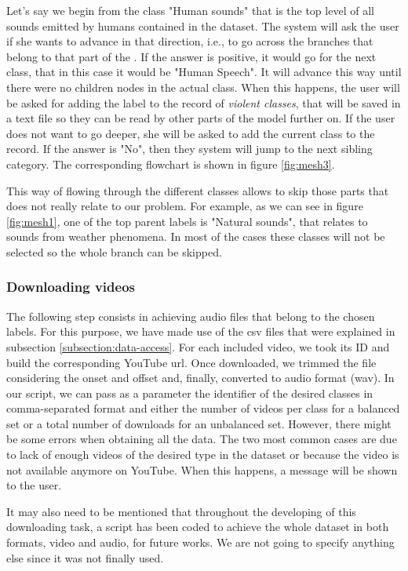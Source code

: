 	
	Let's say we begin from the class "Human sounds" that is the top level of all sounds emitted by humans contained in the dataset. The system will ask the user if she wants to advance in that direction, i.e., to go across the branches that belong to that part of the . If the answer is positive, it would go for the next class, that in this case it would be "Human Speech". It will advance this way until there were no children nodes in the actual class. When this happens, the user will be asked for adding the label to the record of \textit{violent classes}, that will be saved in a text file so they can be read by other parts of the model further on. If the user does not want to go deeper, she will be asked to add the current class to the record. If the answer is "No", then they system will jump to the next sibling category. The corresponding flowchart is shown in figure \ref{fig:mesh3}.
	
	This way of flowing through the different classes allows to skip those parts that does not really relate to our problem. For example, as we can see in figure \ref{fig:mesh1}, one of the top parent labels is "Natural sounds", that relates to sounds from weather phenomena. In most of the cases these classes will not be selected so the whole branch can be skipped. 
	
\subsubsection{Downloading videos}

	The following step consists in achieving audio files that belong to the chosen labels. For this purpose, we have made use of the \acrshort{csv} files that were explained in subsection \ref{subsection:data-access}. For each included video, we took its ID and build the corresponding YouTube \acrshort{url}. Once downloaded, we trimmed the file considering the onset and offset and, finally, converted to audio format (\acrshort{wav}). In our script, we can pass as a parameter the identifier of the desired classes in comma-separated format and either the number of videos per class for a balanced set or a total number of downloads for an unbalanced set. However, there might be some errors when obtaining all the data. The two most common cases are due to lack of enough videos of the desired type in the dataset or because the video is not available anymore on YouTube. When this happens, a message will be shown to the user.
	
	It may also need to be mentioned that throughout the developing of this downloading task, a script has been coded to achieve the whole dataset in both formats, video and audio, for future works. We are not going to specify anything else since it was not finally used.
	

